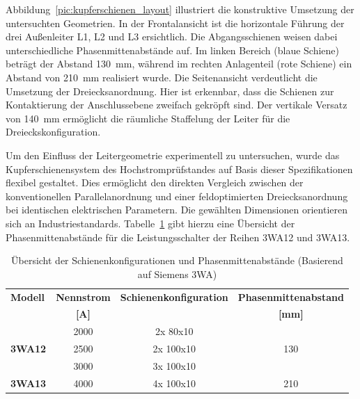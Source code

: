 Abbildung~\ref{pic:kupferschienen_layout} illustriert die konstruktive Umsetzung der untersuchten Geometrien. In der Frontalansicht ist die horizontale Führung der drei Außenleiter L1, L2 und L3 ersichtlich. Die Abgangsschienen weisen dabei unterschiedliche Phasenmittenabstände auf. Im linken Bereich (blaue Schiene) beträgt der Abstand \SI{130}{mm}, während im rechten Anlagenteil (rote Schiene) ein Abstand von \SI{210}{mm} realisiert wurde. Die Seitenansicht verdeutlicht die Umsetzung der Dreiecksanordnung. Hier ist erkennbar, dass die Schienen zur Kontaktierung der Anschlussebene zweifach gekröpft sind. Der vertikale Versatz von \SI{140}{mm} ermöglicht die räumliche Staffelung der Leiter für die Dreieckskonfiguration.

Um den Einfluss der Leitergeometrie experimentell zu untersuchen, wurde das Kupferschienensystem des Hochstromprüfstandes auf Basis dieser Spezifikationen flexibel gestaltet. Dies ermöglicht den direkten Vergleich zwischen der konventionellen Parallelanordnung und einer feldoptimierten Dreiecksanordnung bei identischen elektrischen Parametern. Die gewählten Dimensionen orientieren sich an Industriestandards. Tabelle~\ref{tab:schienen_konfiguration} gibt hierzu eine Übersicht der Phasenmittenabstände für die Leistungsschalter der Reihen 3WA12 und 3WA13.

\begin{table}[H]
    \centering
    \caption{Übersicht der Schienenkonfigurationen und Phasenmittenabstände (Basierend auf Siemens 3WA)}
    \label{tab:schienen_konfiguration}
    \begin{tabular}{lccc}
        \toprule
        \textbf{Modell}                 & \textbf{Nennstrom} & \textbf{Schienenkonfiguration} & \textbf{Phasenmittenabstand} \\
                                        & \textbf{[A]}       &                                & \textbf{[mm]}                \\
        \midrule
        \multirow{3}{*}{\textbf{3WA12}} & 2000               & 2x 80x10                       & \multirow{3}{*}{130}         \\
                                        & 2500               & 2x 100x10                      &                              \\
                                        & 3000               & 3x 100x10                      &                              \\
        \midrule
        \textbf{3WA13}                  & 4000               & 4x 100x10                      & 210                          \\
        \bottomrule
    \end{tabular}
\end{table}

